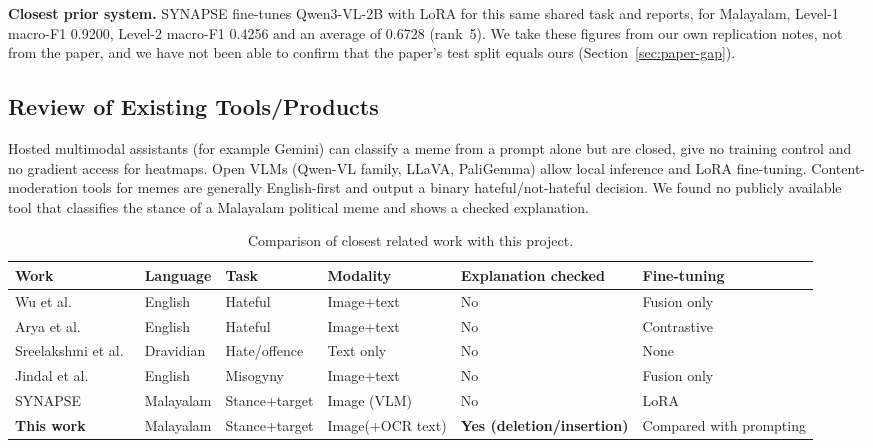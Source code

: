 \textbf{Closest prior system.} SYNAPSE \cite{synapse2026} fine-tunes Qwen3-VL-2B with LoRA for this same shared task and reports, for Malayalam, Level-1 macro-F1 0.9200, Level-2 macro-F1 0.4256 and an average of 0.6728 (rank~5). We take these figures from our own replication notes, not from the paper, and we have not been able to confirm that the paper's test split equals ours (Section~\ref{sec:paper-gap}).

\subsection{Review of Existing Tools/Products}

Hosted multimodal assistants (for example Gemini) can classify a meme from a prompt alone but are closed, give no training control and no gradient access for heatmaps. Open VLMs (Qwen-VL family, LLaVA, PaliGemma) allow local inference and LoRA fine-tuning. Content-moderation tools for memes are generally English-first and output a binary hateful/not-hateful decision. We found no publicly available tool that classifies the stance of a Malayalam political meme and shows a checked explanation.

\begin{table}[h]
\centering
\caption{Comparison of closest related work with this project.}
\label{tab:related}
\small
\begin{tabular}{p{3.0cm}p{1.9cm}p{2.0cm}p{2.3cm}p{2.0cm}p{1.6cm}}
\toprule
Work & Language & Task & Modality & Explanation checked & Fine-tuning \\
\midrule
Wu et al.\ \cite{wu2024tcam} & English & Hateful & Image+text & No & Fusion only \\
Arya et al.\ \cite{arya2024clip} & English & Hateful & Image+text & No & Contrastive \\
Sreelakshmi et al.\ \cite{sreelakshmi2024hasoc} & Dravidian & Hate/offence & Text only & No & None \\
Jindal et al.\ \cite{jindal2024mistra} & English & Misogyny & Image+text & No & Fusion only \\
SYNAPSE \cite{synapse2026} & Malayalam & Stance+target & Image (VLM) & No & LoRA \\
\textbf{This work} & Malayalam & Stance+target & Image(+OCR text) & \textbf{Yes (deletion/insertion)} & Compared with prompting \\
\bottomrule
\end{tabular}
\end{table}


